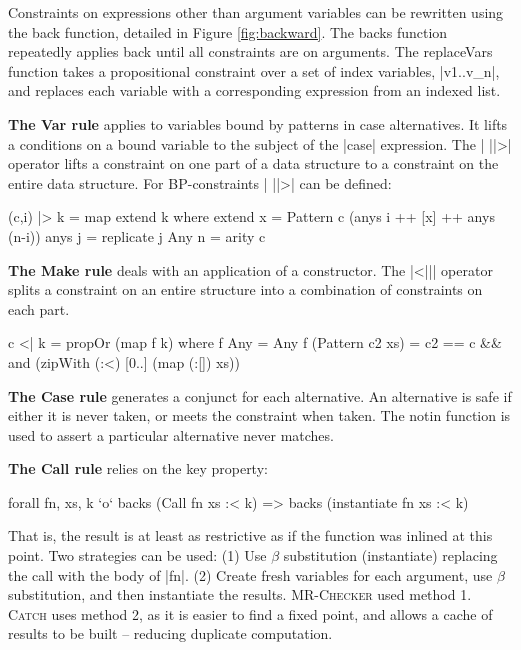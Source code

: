 \documentclass[preprint]{sigplanconf}
\newcommand{\C}[1]{\textsf{#1}}
\newcommand{\catch}{\textsc{Catch}}
\newcommand{\newtool}{\anon{\catch07}{\catch}}
\newcommand{\oldtool}{\anon{\catch05}{\textsc{MR-Checker}}}
\newcommand{\para}[1]{\vspace{2mm}\noindent\textbf{#1}}
\newcommand{\anon}[2]{#2}
\begin{document}
Constraints on expressions other than argument variables can be rewritten using the \C{back} function, detailed in Figure \ref{fig:backward}. The \C{backs} function repeatedly applies \C{back} until all constraints are on arguments. The \C{replaceVars} function takes a propositional constraint over a set of index variables, |v1..v_n|, and replaces each variable with a corresponding expression from an indexed list.

\para{The \C{Var} rule} applies to variables bound by patterns in case alternatives. It lifts a conditions on a bound variable to the subject of the |case| expression. The | ||>| operator lifts a constraint on one part of a data structure to a constraint on the entire data structure. For BP-constraints | ||>| can be defined:

\begin{code}
(c,i) |> k = map extend k
    where
    extend x = Pattern c (anys i ++ [x] ++ anys (n-i))
    anys j = replicate j Any
    n = arity c
\end{code}

\para{The \C{Make} rule} deals with an application of a constructor. The |<||| operator splits a constraint on an entire structure into a combination of constraints on each part.

\begin{code}
c <| k = propOr (map f k)
    where
    f Any = Any
    f (Pattern c2 xs) = c2 == c &&
        and (zipWith (:<) [0..] (map (:[]) xs))
\end{code}

\para{The \C{Case} rule} generates a conjunct for each alternative. An alternative is safe if either it is never taken, or meets the constraint when taken. The \C{notin} function is used to assert a particular alternative never matches.

\para{The \C{Call} rule} relies on the key property:

\begin{code}
forall fn, xs, k `o`  backs (Call fn xs :< k) =>
                      backs (instantiate fn xs :< k)
\end{code}

That is, the result is at least as restrictive as if the function was inlined at this point. Two strategies can be used: (1) Use $\beta$ substitution (\C{instantiate}) replacing the call with the body of |fn|. (2) Create fresh variables for each argument, use $\beta$ substitution, and then instantiate the results. \oldtool{} used method 1. \newtool{} uses method 2, as it is easier to find a fixed point, and allows a cache of results to be built -- reducing duplicate computation.
\end{document}
